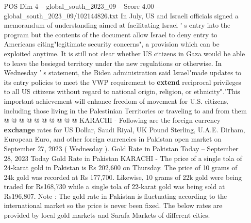 \begin{textsample}{POS Dim 4 – global\_south\_2023\_09 – Score 4.00 – global\_south\_2023\_09/102144826.txt}
In July, US and Israeli officials signed a memorandum of understanding aimed at facilitating Israel ' s entry into the program but the contents of the document allow Israel to deny entry to Americans citing"legitimate security concerns", a provision which can be exploited anytime.
It is still not clear whether US citizens in Gaza would be able to leave the besieged territory under the new regulations or otherwise.
In Wednesday ' s statement, the Biden administration said Israel"made updates to its entry policies to meet the VWP requirement to \textbf{extend} reciprocal privileges to all US citizens without regard to national origin, religion, or ethnicity"."This important achievement will enhance freedom of movement for U.S. citizens, including those living in the Palestinian Territories or traveling to and from them @ @ @ @ @ @ @ @ @ @ KARACHI - Following are the foreign currency \textbf{exchange} rates for US Dollar, Saudi Riyal, UK Pound Sterling, U.A.E.
Dirham, European Euro, and other foreign currencies in Pakistan open market on September 27, 2023 ( Wednesday ).
Gold Rate in Pakistan Today -- September 28, 2023 Today Gold Rate in Pakistan KARACHI - The price of a single tola of 24-karat gold in Pakistan is Rs 202,600 on Thursday.
The price of 10 grams of 24k gold was recorded at Rs 177,700.
Likewise, 10 grams of 22k gold were being traded for Rs168,730 while a single tola of 22-karat gold was being sold at Rs196,807.
Note : The gold rate in Pakistan is fluctuating according to the international market so the price is never been fixed.
The below rates are provided by local gold markets and Sarafa Markets of different cities.

\end{textsample}
